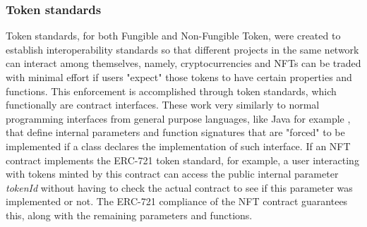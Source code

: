 \documentclass[../main.tex]{subfiles}
\begin{document}
\subsubsection{Token standards}
Token standards, for both Fungible and Non-Fungible Token, were created to establish interoperability standards so that different projects in the same network can interact among themselves, namely, cryptocurrencies and NFTs can be traded with minimal effort if users "expect" those tokens to have certain properties and functions. This enforcement is accomplished through token standards, which functionally are contract interfaces. These work very similarly to normal programming interfaces from general purpose languages, like Java for example \cite{Oracle2024}, that define internal parameters and function signatures that are "forced" to be implemented if a class declares the implementation of such interface. If an NFT contract implements the ERC-721 token standard, for example, a user interacting with tokens minted by this contract can access the public internal parameter \textit{tokenId} without having to check the actual contract to see if this parameter was implemented or not. The ERC-721 compliance of the NFT contract guarantees this, along with the remaining parameters and functions.
\end{document}
